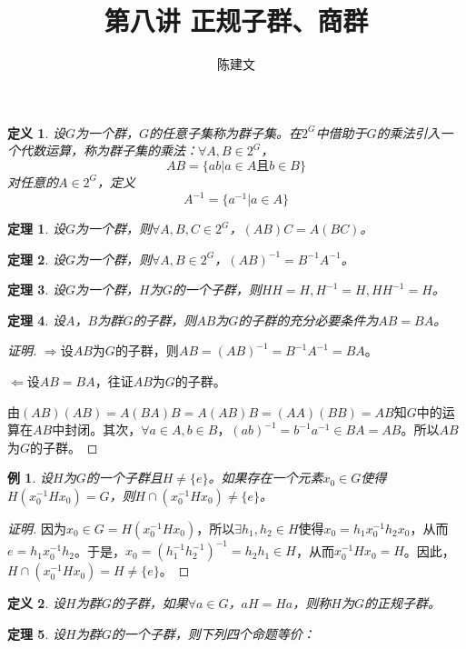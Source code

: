 \documentclass{article}
\newtheorem{Def}{定义}
\newtheorem{Thm}{定理}
\newtheorem*{Example}{例}
\begin{document}
\begin{CJK*}{UTF8}{gbsn}
  \title{第八讲 正规子群、商群}
  \author{陈建文}
  \maketitle
  

\begin{Def}
  设$G$为一个群，$G$的任意子集称为群子集。在$2^G$中借助于$G$的乘法引入一个代数运算，称为群子集的乘法：$\forall A,B\in 2^G$，
  \[AB=\{ab|a\in A \text{且} b\in B\}\]
  对任意的$A\in 2^G$，定义
\[A^{-1}=\{a^{-1}|a\in A\}\]
\end{Def}

\begin{Thm}
  设$G$为一个群，则$\forall A,B,C\in 2^G$，$(AB)C=A(BC)$。
\end{Thm}

\begin{Thm}
  设$G$为一个群，则$\forall A,B\in 2^G$，$(AB)^{-1}=B^{-1}A^{-1}$。
\end{Thm}

\begin{Thm}
  设$G$为一个群，$H$为$G$的一个子群，则$HH=H,H^{-1}=H,HH^{-1}=H$。
\end{Thm}

\begin{Thm}
设$A$，$B$为群$G$的子群，则$AB$为$G$的子群的充分必要条件为$AB=BA$。
\end{Thm}
\begin{proof}[证明]
  $\Rightarrow$设$AB$为$G$的子群，则$AB=(AB)^{-1}=B^{-1}A^{-1}=BA$。

$\Leftarrow$设$AB=BA$，往证$AB$为$G$的子群。

由$(AB)(AB)=A(BA)B=A(AB)B=(AA)(BB)=AB$知$G$中的运算在$AB$中封闭。其次，$\forall a\in A, b\in B$，$(ab)^{-1}=b^{-1}a^{-1}\in BA=AB$。所以$AB$为$G$的子群。
\end{proof}
\begin{Example}
设$H$为$G$的一个子群且$H\neq \{e\}$。如果存在一个元素$x_0\in G$使得$H(x_0^{-1}Hx_0)=G$，则$H\cap (x_0^{-1}Hx_0)\neq \{e\}$。
\end{Example}
\begin{proof}[证明]
  因为$x_0\in G=H(x_0^{-1}Hx_0)$，所以$\exists h_1,h_2\in H$使得$x_0=h_1x_0^{-1}h_2x_0$，从而$e=h_1x_0^{-1}h_2$。于是，$x_0=(h_1^{-1}h_2^{-1})^{-1}=h_2h_1\in H$，从而$x_0^{-1}Hx_0=H$。因此，$H\cap (x_0^{-1}Hx_0)=H\neq \{e\}$。
\end{proof}
\begin{Def}
  设$H$为群$G$的子群，如果$\forall a\in G$，$aH=Ha$，则称$H$为$G$的正规子群。
\end{Def}
\begin{Thm}
 设$H$为群$G$的一个子群，则下列四个命题等价：


\end{Thm}
\end{CJK*}
\end{document}
